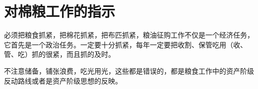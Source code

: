 \section[对棉粮工作的指示（一九六七年五月一日）]{对棉粮工作的指示}


必须把粮食抓紧，把棉花抓紧，把布匹抓紧，粮油征购工作不仅是一个经济任务，它首先是一个政治任务。一定要十分抓紧，每年一定要把收割、保管吃用（收、管、吃）抓的很紧，而且抓的及时。

不注意储备，铺张浪费，吃光用光，这些都是错误的，都是粮食工作中的资产阶级反动路线或者是资产阶级思想的反映。


